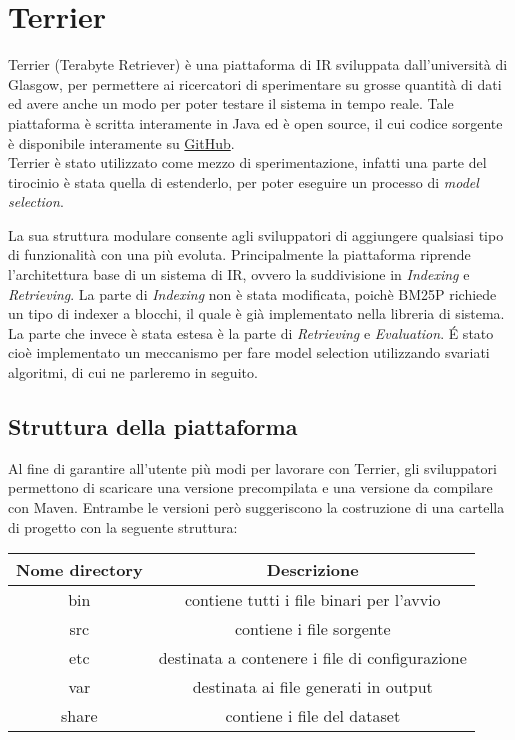\chapter{Terrier}
Terrier (Terabyte Retriever) è una piattaforma di IR sviluppata dall'università di Glasgow, per permettere ai ricercatori di sperimentare su
grosse quantità di dati ed avere anche un modo per poter testare il sistema in tempo reale.
Tale piattaforma è scritta interamente in Java ed è open source, il cui codice sorgente è disponibile
interamente su \href{https://github.com/terrier-org/terrier-core}{GitHub}.
\\
Terrier è stato utilizzato come mezzo di sperimentazione, infatti
una parte del tirocinio è stata quella di estenderlo, per poter eseguire un processo
di \textit{model selection}.

La sua struttura modulare consente agli sviluppatori di aggiungere qualsiasi tipo di funzionalità con una
più evoluta.
Principalmente la piattaforma riprende l'architettura base di un sistema di IR, ovvero la suddivisione in
\textit{Indexing} e \textit{Retrieving}. La parte di \textit{Indexing} non è stata modificata, poichè
BM25P richiede un tipo di indexer a blocchi, il quale è già implementato nella libreria di sistema.
La parte che invece è stata estesa è la parte di \textit{Retrieving} e \textit{Evaluation}. 
\'E stato cioè implementato un meccanismo per fare model selection utilizzando svariati algoritmi, di cui
ne parleremo in seguito. 

\section{Struttura della piattaforma}
Al fine di garantire all'utente più modi per lavorare con Terrier, gli sviluppatori
permettono di scaricare una versione precompilata e una versione da compilare con
Maven. Entrambe le versioni però suggeriscono la costruzione
di una cartella di progetto con la seguente struttura:

\pagebreak

\begin{table}[h]
	\centering
	\begin{tabular}{|c|c|}
		\hline
		\textbf{Nome directory} & \textbf{Descrizione} \\
		\hline
		bin & contiene tutti i file binari per l'avvio \\
		\hline
		src & contiene i file sorgente \\
		\hline
		etc & destinata a contenere i file di configurazione \\
		\hline
		var & destinata ai file generati in output \\
		\hline
		share & contiene i file del dataset \\
		\hline
	\end{tabular}
\end{table}

